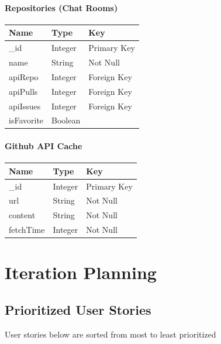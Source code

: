 \documentclass{report}
\begin{document}
\subsubsection{Repositories (Chat Rooms)}
\begin{tabular}{| l | l | l |}
    \hline
    \textbf{Name} & \textbf{Type} & \textbf{Key} \\
    \hline
    \hline
    \_id          & Integer       & Primary Key  \\
    \hline
    name          & String        & Not Null     \\
    \hline
    apiRepo       & Integer       & Foreign Key  \\
    \hline
    apiPulls      & Integer       & Foreign Key  \\
    \hline
    apiIssues     & Integer       & Foreign Key  \\
    \hline
    isFavorite    & Boolean       &              \\
    \hline
\end{tabular}

\subsubsection{Github API Cache}
\begin{tabular}{| l | l | l |}
    \hline
    \textbf{Name} & \textbf{Type} & \textbf{Key} \\
    \hline
    \hline
    \_id          & Integer       & Primary Key  \\
    \hline
    url           & String        & Not Null     \\
    \hline
    content       & String        & Not Null     \\
    \hline
    fetchTime     & Integer       & Not Null     \\
    \hline
\end{tabular}

\chapter{Iteration Planning}

\section{Prioritized User Stories}

User stories below are sorted from most to least prioritized
\end{document}
